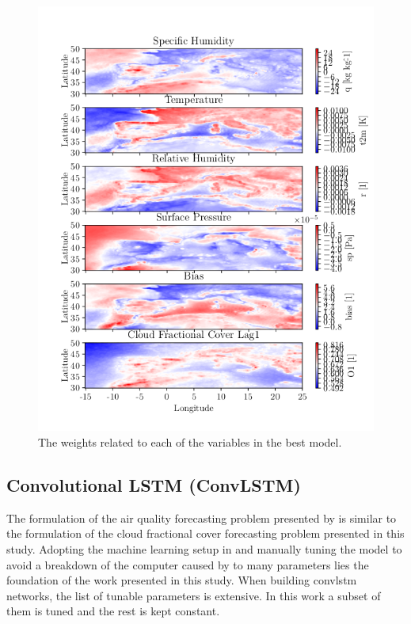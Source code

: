 \begin{figure}
    \centering
    \includegraphics{python_figs/weights_AR-B-S-L5_best_ar_model.png}
    \caption{The weights related to each of the variables in the best model.}
    \label{tab:weights_best_model}
\end{figure}


\clearpage

\subsection{Convolutional LSTM (ConvLSTM)}
The formulation of the air quality forecasting problem presented by \citeauthor{SunAirLSTM} is similar to the formulation of the cloud fractional cover forecasting problem presented in this study. 
Adopting the machine learning setup in  and manually tuning the model to avoid a breakdown of the computer caused by to many parameters lies the foundation of the work presented in this study. When building \acrshort{convlstm} networks, the list of tunable parameters is extensive. In this work a subset of them is tuned and the rest is kept constant.

